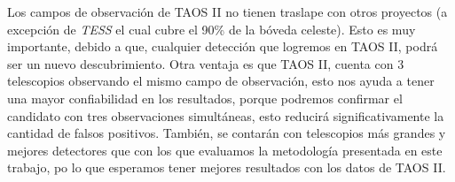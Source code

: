 Los campos de observación de TAOS II no tienen traslape con otros proyectos (a excepción de \textit{TESS} el cual cubre el 90\% de la bóveda celeste). Esto es muy importante, debido a que, cualquier detección que logremos en TAOS II, podrá ser un nuevo descubrimiento. Otra ventaja es que TAOS II, cuenta con 3 telescopios observando el mismo campo de observación, esto nos ayuda a tener una mayor confiabilidad en los resultados, porque podremos confirmar el candidato con tres observaciones simultáneas, esto reducirá significativamente la cantidad de falsos positivos. También, se contarán con telescopios más grandes y mejores detectores que con los que evaluamos la metodología presentada en este trabajo, po lo que esperamos tener mejores resultados con los datos de TAOS II.





